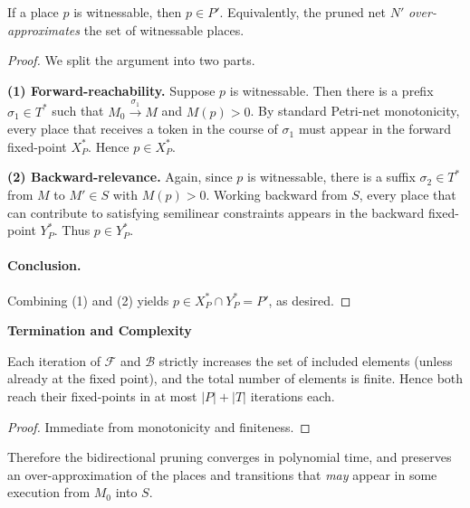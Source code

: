 \begin{theorem}
	\label{thm:invariant}
	If a place $p$ is witnessable, then $p\in P'$.  Equivalently, the
	pruned net $N'$ \emph{over-approximates} the set of witnessable places.
\end{theorem}

\begin{proof}
	We split the argument into two parts.
	
	\medskip
	\noindent
	\textbf{(1) Forward-reachability.}
	Suppose $p$ is witnessable.  Then there is a prefix
	$\sigma_1\in T^*$ such that $M_0\xrightarrow{\sigma_1}M$ and
	$M(p)>0$.  By standard Petri-net monotonicity, every place that
	receives a token in the course of $\sigma_1$ must appear in the
	forward fixed-point $X^*_P$.  Hence $p\in X^*_P$.
	
	\medskip
	\noindent
	\textbf{(2) Backward-relevance.}
	Again, since $p$ is witnessable, there is a suffix
	$\sigma_2\in T^*$ from $M$ to $M'\in S$ with $M(p)>0$.  Working
	backward from $S$, every place that can contribute to satisfying
	semilinear constraints appears in the backward fixed-point $Y^*_P$.
	Thus $p\in Y^*_P$.
	
	\paragraph{Conclusion.}
	Combining (1) and (2) yields $p\in X^*_P\cap Y^*_P = P'$, as desired.
\end{proof}

\medskip
\noindent
\textbf{Termination and Complexity}

\begin{lemma}
	Each iteration of $\mathcal{F}$ and $\mathcal{B}$ strictly increases
	the set of included elements (unless already at the fixed point), and
	the total number of elements is finite.  Hence both reach their
	fixed-points in at most $|P|+|T|$ iterations each.
\end{lemma}

\begin{proof}
	Immediate from monotonicity and finiteness.
\end{proof}

\noindent
Therefore the bidirectional pruning converges in polynomial time, and preserves an over-approximation of the
places and transitions that \emph{may} appear in some execution from
$M_0$ into $S$.






